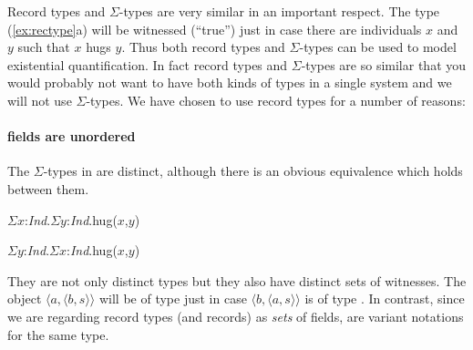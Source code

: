 Record types and $\Sigma$-types are very similar in an important
respect.  The type (\ref{ex:rectype}a) will be witnessed (``true'')
just in case there are individuals $x$ and $y$ such that $x$ hugs
$y$.  Thus both record types and $\Sigma$-types can be used to model
existential quantification.  In fact record types and $\Sigma$-types
are so similar that you would probably not want to have both kinds of
types in a single system and we will not use $\Sigma$-types.  We have
chosen to use record types for a number of reasons:

\paragraph{fields are unordered} The $\Sigma$-types in \nexteg{} are
distinct, although there is an obvious equivalence which holds between
them.
\begin{ex} 
\begin{subex} 
 
\item $\Sigma x$:\textit{Ind}.$\Sigma y$:\textit{Ind}.hug($x$,$y$) 
 
\item $\Sigma y$:\textit{Ind}.$\Sigma x$:\textit{Ind}.hug($x$,$y$) 
 
\end{subex} 
   
\end{ex} 
They are not only distinct types but they also have distinct sets of
witnesses.  The object $\langle a, \langle b, s\rangle\rangle$  will
be of type  just in case $\langle b, \langle a,
s\rangle\rangle$ is of type .  In contrast, since we are
regarding record types (and records) as \textit{sets} of fields,
 are variant notations for the same type.
\begin{ex} 
\begin{subex} 
 
\item {} 
 
\item {} 
 
\end{subex} 
   
\end{ex} 

